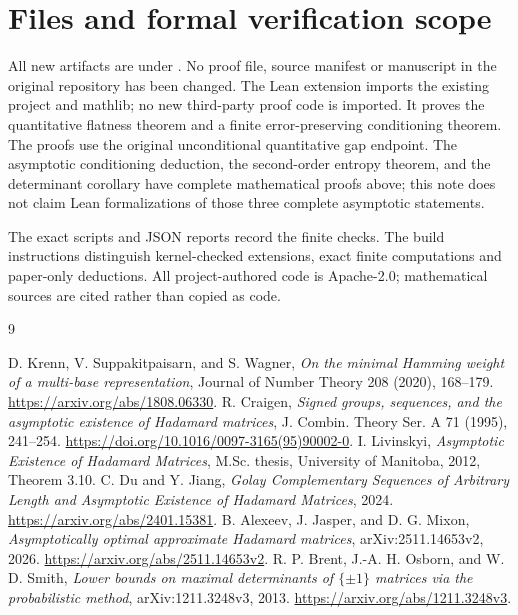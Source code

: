 \documentclass[11pt]{article}
\begin{document}
\section{Files and formal verification scope}
All new artifacts are under . No proof file, source
manifest or manuscript in the original repository has been changed.
The Lean extension imports the existing project and mathlib; no new
third-party proof code is imported. It proves the quantitative flatness
theorem and a finite error-preserving conditioning theorem. The proofs
use the original unconditional quantitative gap endpoint.
The asymptotic conditioning deduction, the second-order entropy theorem,
and the determinant corollary have complete mathematical proofs above;
this note does not claim Lean formalizations of those three complete
asymptotic statements.

The exact scripts and JSON reports record the finite checks. The
build instructions distinguish kernel-checked extensions, exact finite
computations and paper-only deductions. All project-authored code is
Apache-2.0; mathematical sources are cited rather than copied as code.

\begin{thebibliography}{9}
\raggedright
{} D. Krenn, V. Suppakitpaisarn, and S. Wagner,
\emph{On the minimal Hamming weight of a multi-base representation},
Journal of Number Theory 208 (2020), 168--179.
\url{https://arxiv.org/abs/1808.06330}.
 R. Craigen, \emph{Signed groups, sequences, and the
asymptotic existence of Hadamard matrices}, J. Combin. Theory Ser. A
71 (1995), 241--254. \url{https://doi.org/10.1016/0097-3165(95)90002-0}.
 I. Livinskyi, \emph{Asymptotic Existence of Hadamard
Matrices}, M.Sc. thesis, University of Manitoba, 2012, Theorem 3.10.
 C. Du and Y. Jiang, \emph{Golay Complementary Sequences of
Arbitrary Length and Asymptotic Existence of Hadamard Matrices}, 2024.
\url{https://arxiv.org/abs/2401.15381}.
 B. Alexeev, J. Jasper, and D. G. Mixon,
\emph{Asymptotically optimal approximate Hadamard matrices},
arXiv:2511.14653v2, 2026. \url{https://arxiv.org/abs/2511.14653v2}.
 R. P. Brent, J.-A. H. Osborn, and W. D. Smith,
\emph{Lower bounds on maximal determinants of $\{\pm1\}$ matrices via
the probabilistic method}, arXiv:1211.3248v3, 2013.
\url{https://arxiv.org/abs/1211.3248v3}.
\end{thebibliography}
\end{document}
